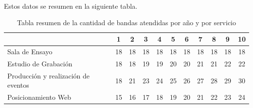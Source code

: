 Estos datos se resumen en la siguiente tabla.
\begin{table}[h]
\centering
\footnotesize
	\begin{tabular}{|p{5cm}|c|c|c|c|c|c|c|c|c|c|} \hline
	\backslashbox{\textbf{Servicio}}{\textbf{Año}} & 1 & 2  & 3  & 4  & 5  & 6  & 7  & 8  & 9  & 10 \\ \hline
	Sala de Ensayo                      & 18             & 18 & 18 & 18 & 18 & 18 & 18 & 18 & 18 & 18\\ \hline
	Estudio de Grabación                & 18             & 18 & 19 & 19 & 20 & 20 & 21 & 21 & 22 & 22 \\ \hline
	Producción y realización de eventos & 18             & 21 & 23 & 24 & 25 & 26 & 27 & 28 & 29 & 30 \\ \hline
	Posicionamiento Web                 & 15             & 16 & 17 & 18 & 19 & 20 & 21 & 22 & 23 & 24 \\ \hline
	\end{tabular}
	\caption{Tabla resumen de la cantidad de bandas atendidas por año y por servicio}
\end{table}
%
%
%
